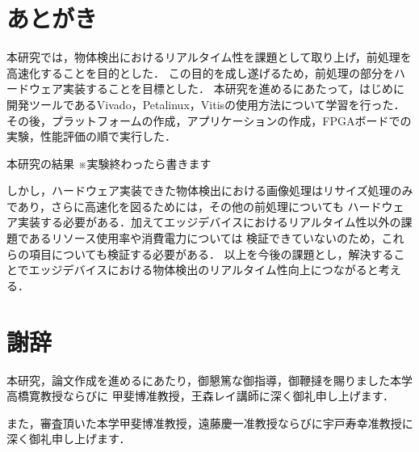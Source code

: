 \documentclass[11pt,a4j]{jreport}
\begin{document}
\chapter{あとがき}
本研究では，物体検出におけるリアルタイム性を課題として取り上げ，前処理を高速化することを目的とした．
この目的を成し遂げるため，前処理の部分をハードウェア実装することを目標とした．
本研究を進めるにあたって，はじめに開発ツールであるVivado，Petalinux，Vitisの使用方法について学習を行った．
その後，プラットフォームの作成，アプリケーションの作成，FPGAボードでの実験，性能評価の順で実行した．

本研究の結果
※実験終わったら書きます

しかし，ハードウェア実装できた物体検出における画像処理はリサイズ処理のみであり，さらに高速化を図るためには，その他の前処理についても
ハードウェア実装する必要がある．加えてエッジデバイスにおけるリアルタイム性以外の課題であるリソース使用率や消費電力については
検証できていないのため，これらの項目についても検証する必要がある．
以上を今後の課題とし，解決することでエッジデバイスにおける物体検出のリアルタイム性向上につながると考える．

\chapter*{謝辞} %
本研究，論文作成を進めるにあたり，御懇篤な御指導，御鞭撻を賜りました本学高橋寛教授ならびに
甲斐博准教授，王森レイ講師に深く御礼申し上げます．

また，審査頂いた本学甲斐博准教授，遠藤慶一准教授ならびに宇戸寿幸准教授に深く御礼申し上げます．
\end{document}
